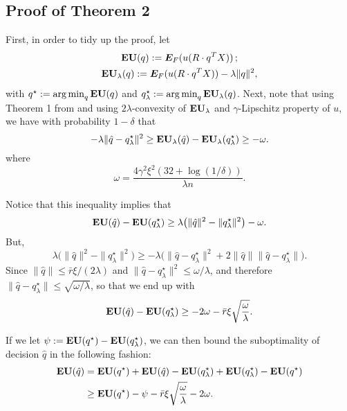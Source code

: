 \subsection{Proof of Theorem 2}

First, in order to tidy up the proof, let
\begin{gather*}
  {\bf EU}(q) := \bm E_F(u(R\cdot q^T X))\,;\\
  {\bf EU}_\lambda(q) := \bm E_F(u(R\cdot q^T X)) - \lambda\|q\|^2,
\end{gather*}
with $q^\star := \operatorname*{arg\,min}_q {\bf EU}(q)$ and $q^\star_\lambda := \operatorname*{arg\,min}_q
{\bf EU}_\lambda(q)$. Next, note that using Theorem 1 from \cite{sridharan2009fast} and using
$2\lambda$-convexity of ${\bf EU}_\lambda$ and $\gamma$-Lipschitz property of $u$, we have with
probability $1-\delta$ that
\[
  -\lambda\|\hat q - q^\star_\lambda\|^2 \geq {\bf EU}_\lambda(\hat q) - {\bf EU}_\lambda(q^\star_\lambda) \geq -\omega.
\]
where
\[
  \omega = \frac{4\gamma^2\xi^2(32 + \log(1/\delta))}{\lambda n}.
\]

Notice that this inequality implies that 
\[
  {\bf EU}(\hat q) - {\bf EU}(q^\star_\lambda) \geq \lambda\bigl(\|\hat q\|^2 - \|q^\star_\lambda\|^2\bigr) -\omega.
\]
But,
\[
  \lambda\bigl(\|\hat q\|^2 - \|q^\star_\lambda\|^2\bigr) \geq -\lambda\bigl(\|\hat q -
  q^\star_\lambda\|^2 +2\|\hat q\|\|\hat q - q^\star_\lambda\|\bigr).
\]
Since $\|\hat q\| \leq \bar r\xi/(2\lambda)$ and
$\|\hat q - q^\star_\lambda\|^2 \leq \omega/\lambda$, and therefore
$\|\hat q - q^\star_\lambda\| \leq \sqrt{\omega/\lambda}$, so that we end up with
\[
  {\bf EU}(\hat q) - {\bf EU}(q^\star_\lambda) \geq -2\omega - \bar r\xi\sqrt{\frac{\omega}{\lambda}}.
\]

If we let $\psi := {\bf EU}(q^\star) -{\bf EU}(q^\star_\lambda)$, we can then bound the
suboptimality of decision $\hat q$ in the following fashion:
\begin{align*}
  {\bf EU}(\hat q) &= {\bf EU}(q^\star) + {\bf EU}(\hat q) - {\bf EU}(q^\star_\lambda) + {\bf EU}(q^\star_\lambda)
                - {\bf EU}(q^\star)\\
              &\geq {\bf EU}(q^\star) - \psi - \bar r\xi\sqrt{\frac{\omega}{\lambda}} - 2\omega.
\end{align*}






